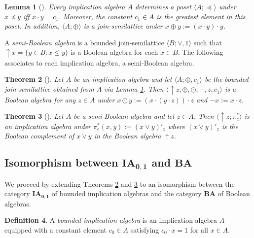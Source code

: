\documentclass[reqno]{amsart}
\theoremstyle{plain}
\newtheorem{theorem}{Theorem}[section]
\newtheorem{lemma}[theorem]{Lemma}
\theoremstyle{definition}
\newtheorem{definition}[theorem]{Definition}
\begin{document}
\begin{lemma}[\cite{abbott672}]\label{bia to poset}
    Every implication algebra $A$ determines a poset $\langle A;\preceq\rangle$ under $x\preceq y$ iff $x\cdot y=c_1$. Moreover, the constant $c_1\in A$ is the greatest element in this poset. In addition, $\langle A;\oplus\rangle$ is a join-semilattice under $x\oplus y:=(x\cdot y)\cdot y$.    
\end{lemma}



    A \emph{semi-Boolean algebra} is a bounded join-semilattice $\langle B;\vee,1\rangle$ such that ${\uparrow}x=\{y\in B:x\leq y\}$ is a Boolean algebra for each $x\in B$. The following associates to each implication algebra, a semi-Boolean algebra.    

\begin{theorem}[\cite{abbott672}]\label{bia to sba}
    Let $A$ be an implication algebra and let $\langle A;\oplus,c_1\rangle$ be the bounded join-semilattice obtained from $A$ via Lemma \ref{bia to poset}. Then $\langle {\uparrow}z;\oplus,\odot,-,z,c_1\rangle$ is a Boolean algebra for any $z\in A$ under $x\odot y:=(x\cdot(y\cdot z))\cdot z$ and $-x:=x\cdot z$.   
\end{theorem}
\begin{theorem}[\cite{abbott672}]\label{sba to bia}
    Let $A$ be a semi-Boolean algebra and let $z\in A$. Then $\langle{\uparrow}z;\pi_c^*\rangle$ is an implication algebra under $\pi_c^*(x,y):=(x\vee y)'_z$ where $(x\vee y)'_z$ is the Boolean complement of $x\vee y$ in the Boolean algebra ${\uparrow}z$. 
\end{theorem}
\subsection{Isomorphism between $\mathbf{IA_{0,1}}$ and $\mathbf{BA}$} We proceed by extending Theorems \ref{bia to sba} and \ref{sba to bia} to an isomorphism between the category $\mathbf{IA_{0,1}}$ of bounded implication algebras and the category $\mathbf{BA}$ of Boolean algebras. 
\begin{definition}\label{definition 2.7}
    A \emph{bounded implication algebra} is an implication algebra $A$ equipped with a constant element $c_0\in A$ satisfying $c_0\cdot x=1$ for all $x\in A$. 
\end{definition}
\end{document}

